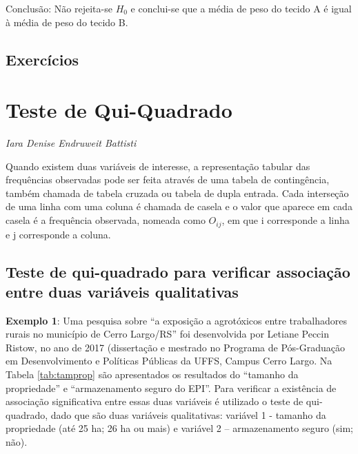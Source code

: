 \documentclass[12pt,brazil,oneside]{book}
\begin{document}
Conclusão: Não rejeita-se \(H_0\) e conclui-se que a média de peso do tecido A é igual à média de peso do tecido B.

\hypertarget{exercicios-2}{%
\section{Exercícios}\label{exercicios-2}}

\hypertarget{qui}{%
\chapter{Teste de Qui-Quadrado}\label{qui}}

\emph{Iara Denise Endruweit Battisti}

\begin{flushright}
\emph{}
\end{flushright}

Quando existem duas variáveis de interesse, a representação tabular das frequências observadas pode ser feita através de uma tabela de contingência, também chamada de tabela cruzada ou tabela de dupla entrada. Cada interseção de uma linha com uma coluna é chamada de casela e o valor que aparece em cada casela é a frequência observada, nomeada como \(O_{ij}\), em que i corresponde a linha e j corresponde a coluna.

\hypertarget{teste-de-qui-quadrado-para-verificar-associacao-entre-duas-variaveis-qualitativas}{%
\section{Teste de qui-quadrado para verificar associação entre duas variáveis qualitativas}\label{teste-de-qui-quadrado-para-verificar-associacao-entre-duas-variaveis-qualitativas}}

\textbf{Exemplo 1}: Uma pesquisa sobre ``a exposição a agrotóxicos entre trabalhadores rurais no município de Cerro Largo/RS'' foi desenvolvida por Letiane Peccin Ristow, no ano de 2017 (dissertação e mestrado no Programa de Pós-Graduação em Desenvolvimento e Políticas Públicas da UFFS, Campus Cerro Largo. Na Tabela \ref{tab:tamprop} são apresentados os resultados do ``tamanho da propriedade'' e ``armazenamento seguro do EPI''. Para verificar a existência de associação significativa entre essas duas variáveis é utilizado o teste de qui-quadrado, dado que são duas variáveis qualitativas: variável 1 - tamanho da propriedade (até 25 ha; 26 ha ou mais) e variável 2 -- armazenamento seguro (sim; não).
\end{document}
